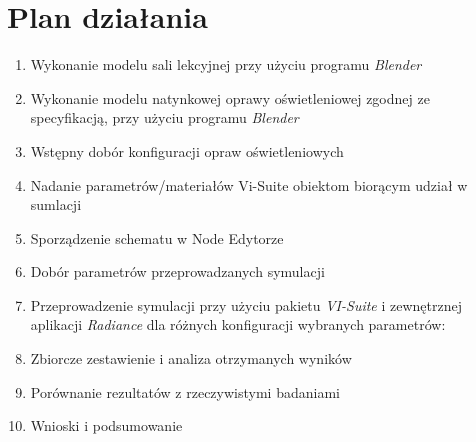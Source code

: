 \documentclass[a4paper,12pt]{article}
\begin{document}
	\section{Plan działania}
	\label{sec:plan_dzialania}
	\begin{enumerate}
		\item Wykonanie modelu sali lekcyjnej przy użyciu programu \emph{Blender} \checkmark
		\item Wykonanie modelu natynkowej oprawy oświetleniowej zgodnej ze specyfikacją, przy użyciu programu \emph{Blender} \checkmark
		\item Wstępny dobór konfiguracji opraw oświetleniowych \checkmark
		\item Nadanie parametrów/materiałów Vi-Suite obiektom biorącym udział w sumlacji \checkmark
		\item Sporządzenie schematu w Node Edytorze \checkmark
		\item Dobór parametrów przeprowadzanych symulacji \checkmark
		\item Przeprowadzenie symulacji przy użyciu pakietu \emph{VI-Suite} i zewnętrznej aplikacji \emph{Radiance} dla różnych konfiguracji wybranych parametrów:
		\item Zbiorcze zestawienie i analiza otrzymanych wyników 
		\item Porównanie rezultatów z rzeczywistymi badaniami
		\item Wnioski i podsumowanie
		
	\end{enumerate}
	
\end{document}
